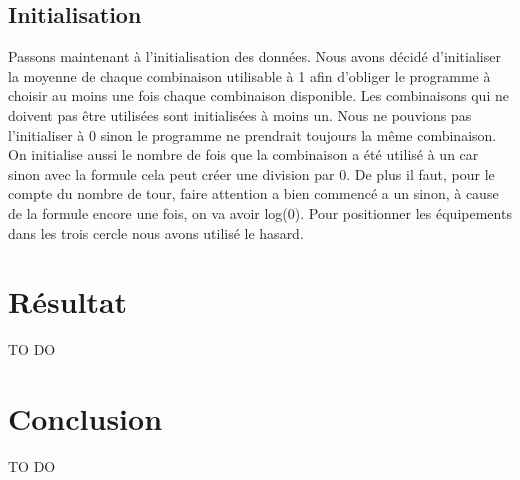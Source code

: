 \documentclass[12pt,a4paper]{article}
\begin{document}
\subsection{Initialisation}
\label{sub.exp.struct}
Passons maintenant à l'initialisation des données. Nous avons décidé 
d'initialiser la moyenne de chaque combinaison utilisable à 1 afin d'obliger le 
programme à choisir au moins une fois chaque combinaison disponible. 
Les combinaisons qui ne doivent pas être utilisées sont initialisées à moins 
un. Nous ne pouvions pas l'initialiser à 0 sinon le programme ne prendrait 
toujours la même combinaison. On initialise aussi le nombre de fois que 
la combinaison a été utilisé à un car sinon avec la formule cela peut créer 
une division par 0. De plus il faut, pour le compte du nombre de tour, faire 
attention a bien commencé a un sinon, à cause de la formule encore une fois, 
on va avoir log(0). Pour positionner les équipements dans les trois cercle nous 
avons utilisé le hasard. 

\section{Résultat}
\label{sec.res}
 TO DO


\section{Conclusion}
\label{sec.conc}

TO DO
\end{document}

